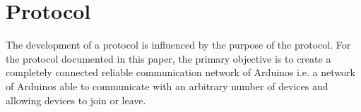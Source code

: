 \section{Protocol}
The development of a protocol is influenced by the purpose of the protocol.
For the protocol documented in this paper, the primary objective is to create a completely connected reliable communication network of Arduinos i.e. a network of Arduinos able to communicate with an arbitrary number of devices and allowing devices to join or leave.

